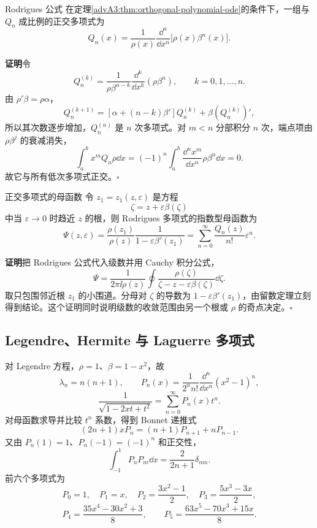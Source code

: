 \begin{advtheorem}{Rodrigues 公式}\label{advA3:thm:rodrigues}
在定理\ref{advA3:thm:orthogonal-polynomial-ode}的条件下，一组与 $Q_n$ 成比例的正交多项式为
\[
 \boxed{Q_n(x)=\frac1{\rho(x)}\frac{\dd^n}{\dd x^n}
 \bigl[\rho(x)\beta^n(x)\bigr]}.
\]
\end{advtheorem}
\noindent\textbf{证明}\quad 令
\[
 Q_n^{(k)}=\frac1{\rho\beta^{n-k}}
 \frac{\dd^k}{\dd x^k}(\rho\beta^n),\qquad k=0,1,\ldots,n.
\]
由 $\rho'\beta=\rho\alpha$，
\[
 Q_n^{(k+1)}=[\alpha+(n-k)\beta']Q_n^{(k)}
 +\beta(Q_n^{(k)})',
\]
所以其次数逐步增加，$Q_n^{(n)}$ 是 $n$ 次多项式。对 $m<n$ 分部积分 $n$ 次，端点项由 $\rho\beta^j$ 的衰减消失，
\[
 \int_a^b x^mQ_n\rho\dd x
 =(-1)^n\int_a^b\frac{\dd^n x^m}{\dd x^n}\rho\beta^n\dd x=0.
\]
故它与所有低次多项式正交。\hfill$\square$

\begin{advtheorem}{正交多项式的母函数}\label{advA3:thm:generating-function}
令 $z_1=z_1(z,\varepsilon)$ 是方程
\[
 \zeta=z+\varepsilon\beta(\zeta)
\]
中当 $\varepsilon\to0$ 时趋近 $z$ 的根，则 Rodrigues 多项式的指数型母函数为
\[
 \boxed{\Psi(z,\varepsilon)=
 \frac{\rho(z_1)}{\rho(z)}\frac1{1-\varepsilon\beta'(z_1)}
 =\sum_{n=0}^\infty\frac{Q_n(z)}{n!}\varepsilon^n}.
\]
\end{advtheorem}
\noindent\textbf{证明}\quad 把 Rodrigues 公式代入级数并用 Cauchy 积分公式，
\[
 \Psi=\frac1{2\pi\ii\rho(z)}\oint
 \frac{\rho(\zeta)}{\zeta-z-\varepsilon\beta(\zeta)}\dd\zeta.
\]
取只包围邻近根 $z_1$ 的小围道。分母对 $\zeta$ 的导数为
$1-\varepsilon\beta'(z_1)$，由留数定理立刻得到结论。这个证明同时说明级数的收敛范围由另一个根或 $\rho$ 的奇点决定。\hfill$\square$

\subsection{Legendre、Hermite 与 Laguerre 多项式}

对 Legendre 方程，$\rho=1$、$\beta=1-x^2$，故
\[
 \lambda_n=n(n+1),\qquad
 P_n(x)=\frac1{2^nn!}\frac{\dd^n}{\dd x^n}(x^2-1)^n,
\]
\[
 \frac1{\sqrt{1-2xt+t^2}}=\sum_{n=0}^\infty P_n(x)t^n.
\]
对母函数求导并比较 $t^n$ 系数，得到 Bonnet 递推式
\[
 (2n+1)xP_n=(n+1)P_{n+1}+nP_{n-1}.
\]
又由 $P_n(1)=1$、$P_n(-1)=(-1)^n$ 和正交性，
\[
 \int_{-1}^1P_nP_m\dd x=\frac2{2n+1}\delta_{nm}.
\]
前六个多项式为
\[
 P_0=1,\quad P_1=x,\quad P_2=\frac{3x^2-1}{2},\quad
 P_3=\frac{5x^3-3x}{2},
\]
\[
 P_4=\frac{35x^4-30x^2+3}{8},\qquad
 P_5=\frac{63x^5-70x^3+15x}{8}.
\]

